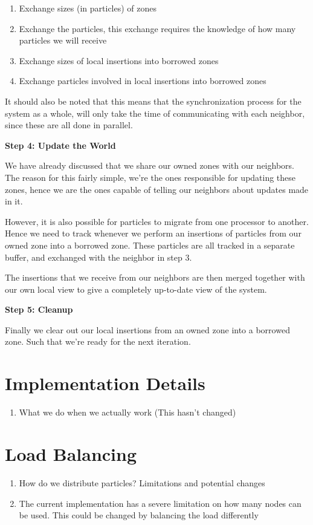 \begin{enumerate}
	\item Exchange sizes (in particles) of zones
	\item Exchange the particles, this exchange requires the knowledge of how many particles we will receive
	\item Exchange sizes of local insertions into borrowed zones
	\item Exchange particles involved in local insertions into borrowed zones
\end{enumerate}

It should also be noted that this means that the synchronization process for the system as a whole, will only take the
time of communicating with each neighbor, since these are all done in parallel.

\textbf{Step 4: Update the World}

We have already discussed that we share our owned zones with our neighbors. The reason for this fairly simple, we're the
ones responsible for updating these zones, hence we are the ones capable of telling our neighbors about updates made in
it.

However, it is also possible for particles to migrate from one processor to another. Hence we need to track whenever we
perform an insertions of particles from our owned zone into a borrowed zone. These particles are all tracked in a
separate buffer, and exchanged with the neighbor in step 3.

The insertions that we receive from our neighbors are then merged together with our own local view to give a completely
up-to-date view of the system.

\textbf{Step 5: Cleanup}

Finally we clear out our local insertions from an owned zone into a borrowed zone. Such that we're ready for the next 
iteration.

\section{Implementation Details}
\begin{enumerate}
  \item{What we do when we actually work (This hasn't changed)}
\end{enumerate}

\section{Load Balancing}
\begin{enumerate}
  \item{How do we distribute particles? Limitations and potential changes}
  \item{The current implementation has a severe limitation on how many nodes can be used. This could be changed by 
        balancing the load differently}
\end{enumerate}

